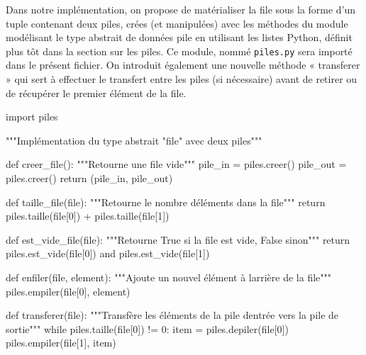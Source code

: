 \documentclass[
  letterpaper,
  DIV=11,
  numbers=noendperiod]{scrartcl}
\newenvironment{Shaded}{\begin{snugshade}}{\end{snugshade}}
\newcommand{\BuiltInTok}[1]{\textcolor[rgb]{0.00,0.23,0.31}{#1}}
\newcommand{\CommentTok}[1]{\textcolor[rgb]{0.37,0.37,0.37}{#1}}
\newcommand{\ControlFlowTok}[1]{\textcolor[rgb]{0.00,0.23,0.31}{#1}}
\newcommand{\DecValTok}[1]{\textcolor[rgb]{0.68,0.00,0.00}{#1}}
\newcommand{\ImportTok}[1]{\textcolor[rgb]{0.00,0.46,0.62}{#1}}
\newcommand{\KeywordTok}[1]{\textcolor[rgb]{0.00,0.23,0.31}{#1}}
\newcommand{\NormalTok}[1]{\textcolor[rgb]{0.00,0.23,0.31}{#1}}
\newcommand{\OperatorTok}[1]{\textcolor[rgb]{0.37,0.37,0.37}{#1}}
\begin{document}
Dans notre implémentation, on propose de matérialiser la file sous la
forme d'un tuple contenant deux piles, crées (et manipulées) avec les
méthodes du module modélisant le type abstrait de données pile en
utilisant les listes Python, définit plus tôt dans la section sur les
piles. Ce module, nommé \texttt{piles.py} sera importé dans le présent
fichier. On introduit également une nouvelle méthode « transferer » qui
sert à effectuer le transfert entre les piles (si nécessaire) avant de
retirer ou de récupérer le premier élément de la file.

\begin{Shaded}
\begin{Highlighting}[]
\ImportTok{import}\NormalTok{ piles}

\CommentTok{"""Implémentation du type abstrait "file" avec deux piles"""}


\KeywordTok{def}\NormalTok{ creer\_file():}
    \CommentTok{"""Retourne une file vide"""}
\NormalTok{    pile\_in }\OperatorTok{=}\NormalTok{ piles.creer()}
\NormalTok{    pile\_out }\OperatorTok{=}\NormalTok{ piles.creer()}
    \ControlFlowTok{return}\NormalTok{ (pile\_in, pile\_out)}


\KeywordTok{def}\NormalTok{ taille\_file(}\BuiltInTok{file}\NormalTok{):}
    \CommentTok{"""Retourne le nombre d\textquotesingle{}éléments dans la file"""}
    \ControlFlowTok{return}\NormalTok{ piles.taille(}\BuiltInTok{file}\NormalTok{[}\DecValTok{0}\NormalTok{]) }\OperatorTok{+}\NormalTok{ piles.taille(}\BuiltInTok{file}\NormalTok{[}\DecValTok{1}\NormalTok{])}


\KeywordTok{def}\NormalTok{ est\_vide\_file(}\BuiltInTok{file}\NormalTok{):}
    \CommentTok{"""Retourne True si la file est vide, False sinon"""}
    \ControlFlowTok{return}\NormalTok{ piles.est\_vide(}\BuiltInTok{file}\NormalTok{[}\DecValTok{0}\NormalTok{]) }\KeywordTok{and}\NormalTok{ piles.est\_vide(}\BuiltInTok{file}\NormalTok{[}\DecValTok{1}\NormalTok{])}


\KeywordTok{def}\NormalTok{ enfiler(}\BuiltInTok{file}\NormalTok{, element):}
    \CommentTok{"""Ajoute un nouvel élément à l\textquotesingle{}arrière de la file"""}
\NormalTok{    piles.empiler(}\BuiltInTok{file}\NormalTok{[}\DecValTok{0}\NormalTok{], element)}


\KeywordTok{def}\NormalTok{ transferer(}\BuiltInTok{file}\NormalTok{):}
    \CommentTok{"""Transfère les éléments de la pile d\textquotesingle{}entrée vers la pile de sortie"""}
    \ControlFlowTok{while}\NormalTok{ piles.taille(}\BuiltInTok{file}\NormalTok{[}\DecValTok{0}\NormalTok{]) }\OperatorTok{!=} \DecValTok{0}\NormalTok{:}
\NormalTok{        item }\OperatorTok{=}\NormalTok{ piles.depiler(}\BuiltInTok{file}\NormalTok{[}\DecValTok{0}\NormalTok{])}
\NormalTok{        piles.empiler(}\BuiltInTok{file}\NormalTok{[}\DecValTok{1}\NormalTok{], item)}



\end{Highlighting}
\end{Shaded}
\end{document}
